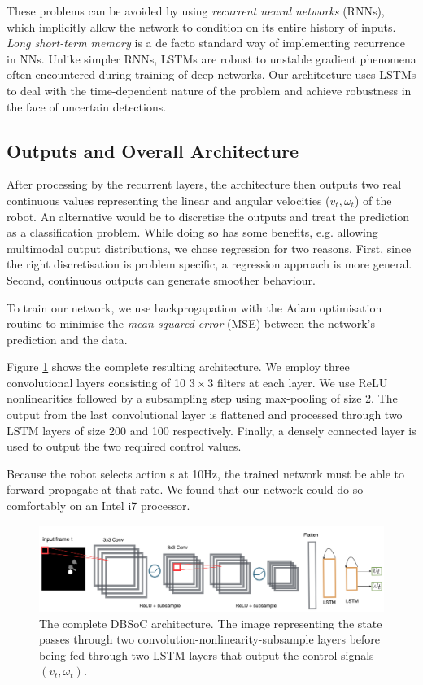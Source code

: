 \documentclass[letterpaper, 10 pt, conference]{ieeeconf}
\begin{document}
These problems can be avoided by using \emph{recurrent neural networks} (RNNs), which implicitly allow the network to condition on its entire history of inputs.  \emph{Long short-term memory} \cite{hochreiter1997long} is a de facto standard way of implementing recurrence in NNs. Unlike simpler RNNs, LSTMs are robust to unstable gradient phenomena often encountered during training of deep networks. Our architecture uses LSTMs to deal with the time-dependent nature of the problem and achieve robustness in the face of uncertain detections.

\subsection{Outputs and Overall Architecture}
After processing by the recurrent layers, the architecture then outputs two real continuous values representing the linear and angular velocities ($v_t,\omega_t$) of the robot. An alternative would be to discretise the outputs and treat the prediction as a classification problem. While doing so has some benefits, e.g. allowing multimodal output distributions, we chose regression for two reasons. First, since the right discretisation is problem specific, a regression approach is more general. Second, continuous outputs can generate smoother behaviour. 

To train our network, we use backprogapation with the Adam \cite{kingma2014adam} optimisation routine to minimise the \emph{mean squared error} (MSE) between the network's prediction and the data. 

Figure \ref{fig:arch} shows the complete resulting architecture. We employ three convolutional layers consisting of 10 $3 \times 3$ filters at each layer. We use ReLU nonlinearities followed by a subsampling step using max-pooling of size 2. The output from the last convolutional layer is flattened and processed through two LSTM layers of size 200 and 100 respectively. Finally, a densely connected layer is used to output the two required control values. 

Because the robot selects action s at 10Hz, the trained network must be able to forward propagate at that rate.  We found that our network could do so comfortably on an Intel i7 processor.


  	\begin{figure}[tbh]
	\centering
    \includegraphics[scale = 0.22]{images/arch.png}
  \caption{The complete DBSoC architecture. The image representing the state passes through two convolution-nonlinearity-subsample layers before being fed through two LSTM layers that output the control signals $(v_t,\omega_t)$. }

    \vspace{-2mm}
  \label{fig:arch}
  \end{figure}
\end{document}
